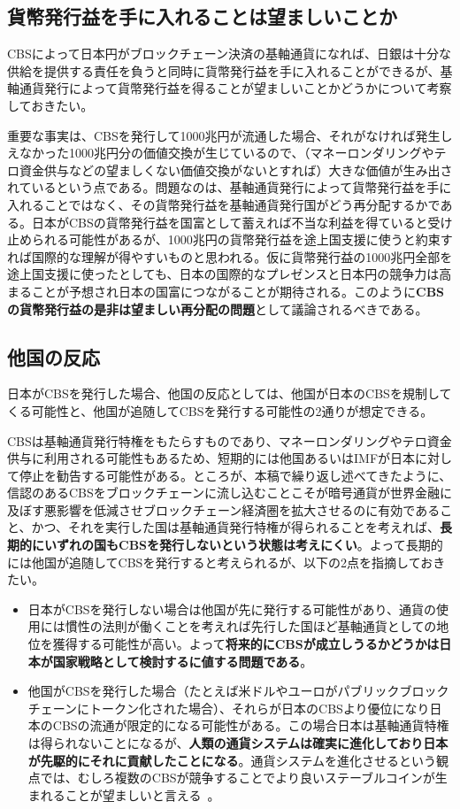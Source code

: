 \documentclass[dvipdfmx,a4paper]{jsarticle}
\begin{document}
\subsection{貨幣発行益を手に入れることは望ましいことか}

CBSによって日本円がブロックチェーン決済の基軸通貨になれば、日銀は十分な供給を提供する責任を負うと同時に貨幣発行益を手に入れることができるが、基軸通貨発行によって貨幣発行益を得ることが望ましいことかどうかについて考察しておきたい。

重要な事実は、CBSを発行して1000兆円が流通した場合、それがなければ発生しえなかった1000兆円分の価値交換が生じているので、（マネーロンダリングやテロ資金供与などの望ましくない価値交換がないとすれば）大きな価値が生み出されているという点である。問題なのは、基軸通貨発行によって貨幣発行益を手に入れることではなく、その貨幣発行益を基軸通貨発行国がどう再分配するかである。日本がCBSの貨幣発行益を国富として蓄えれば不当な利益を得ていると受け止められる可能性があるが、1000兆円の貨幣発行益を途上国支援に使うと約束すれば国際的な理解が得やすいものと思われる。仮に貨幣発行益の1000兆円全部を途上国支援に使ったとしても、日本の国際的なプレゼンスと日本円の競争力は高まることが予想され日本の国富につながることが期待される。このように\textbf{CBSの貨幣発行益の是非は望ましい再分配の問題}として議論されるべきである。

\subsection{他国の反応}

日本がCBSを発行した場合、他国の反応としては、他国が日本のCBSを規制してくる可能性と、他国が追随してCBSを発行する可能性の2通りが想定できる。

CBSは基軸通貨発行特権をもたらすものであり、マネーロンダリングやテロ資金供与に利用される可能性もあるため、短期的には他国あるいはIMFが日本に対して停止を勧告する可能性がある。ところが、本稿で繰り返し述べてきたように、信認のあるCBSをブロックチェーンに流し込むことこそが暗号通貨が世界金融に及ぼす悪影響を低減させブロックチェーン経済圏を拡大させるのに有効であること、かつ、それを実行した国は基軸通貨発行特権が得られることを考えれば、\textbf{長期的にいずれの国もCBSを発行しないという状態は考えにくい}。よって長期的には他国が追随してCBSを発行すると考えられるが、以下の2点を指摘しておきたい。

\begin{itemize}
\item 日本がCBSを発行しない場合は他国が先に発行する可能性があり、通貨の使用には慣性の法則が働くことを考えれば先行した国ほど基軸通貨としての地位を獲得する可能性が高い。よって\textbf{将来的にCBSが成立しうるかどうかは日本が国家戦略として検討するに値する問題である}。
\item 他国がCBSを発行した場合（たとえば米ドルやユーロがパブリックブロックチェーンにトークン化された場合）、それらが日本のCBSより優位になり日本のCBSの流通が限定的になる可能性がある。この場合日本は基軸通貨特権は得られないことになるが、\textbf{人類の通貨システムは確実に進化しており日本が先駆的にそれに貢献したことになる}。通貨システムを進化させるという観点では、むしろ複数のCBSが競争することでより良いステーブルコインが生まれることが望ましいと言える~\cite{hayek2009denationalisation}。
\end{itemize}
\end{document}
